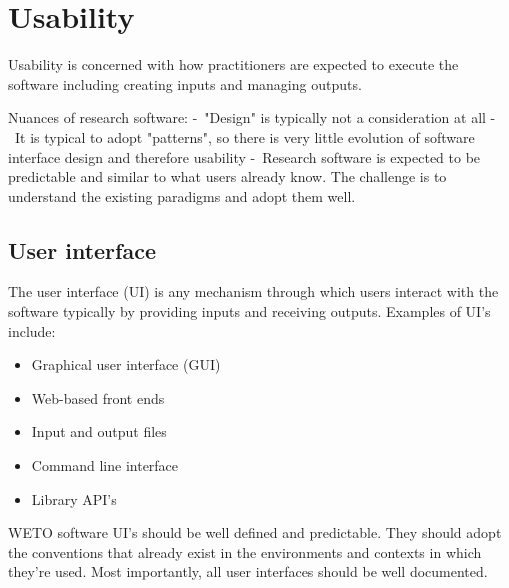 \documentclass[]{nrel}
\begin{document}
\chapter{Usability}
Usability is concerned with how practitioners are expected to execute the software including
creating inputs and managing outputs.

Nuances of research software:
- "Design" is typically not a consideration at all
- It is typical to adopt "patterns", so there is very little evolution of software interface design and therefore usability
- Research software is expected to be predictable and similar to what users already know. The challenge is to understand the existing paradigms and adopt them well.


\section{User interface}
The user interface (UI) is any mechanism through which users interact with the software
typically by providing inputs and receiving outputs. Examples of UI’s include:
\begin{itemize}
\item Graphical user interface (GUI)

\item Web-based front ends

\item Input and output files

\item Command line interface

\item Library API’s

\end{itemize}

WETO software UI’s should be well defined and predictable.
They should adopt the conventions that already exist in the environments and contexts
in which they’re used.
Most importantly, all user interfaces should be well documented.
\end{document}
